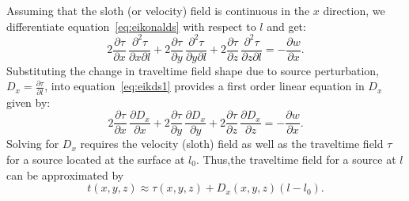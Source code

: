 Assuming that the sloth (or velocity) field is continuous in the $x$
direction, we differentiate equation~\ref{eq:eikonalds} with respect
to $l$ and get:
\begin{equation}
2 \frac{\partial \tau}{\partial x} \, \frac{\partial^2 \tau}{\partial x \partial l} + 
2 \frac{\partial \tau}{\partial y} \, \frac{\partial^2 \tau}{\partial y \partial l}+
2 \frac{\partial \tau}{\partial z} \, \frac{\partial^2 \tau}{\partial z \partial l} = -\frac{\partial w}{\partial x}.
\label{eq:eikds1}
\end{equation}
Substituting the change in traveltime field shape due to source
perturbation, $D_x=\frac{\partial \tau}{\partial l}$, into
equation~\ref{eq:eikds1} provides a first order linear equation in
$D_x$ given by:
\begin{equation}
2 \frac{\partial \tau}{\partial x} \, \frac{\partial D_x}{\partial x}+ 
2 \frac{\partial \tau}{\partial y} \, \frac{\partial D_x}{\partial y} +
2 \frac{\partial \tau}{\partial z} \, \frac{\partial D_x}{\partial z} = - \frac{\partial w}{\partial x}.
\label{eq:eikdsD}
\end{equation}
Solving for $D_x$ requires the velocity (sloth) field as well as the traveltime field $\tau$ for a source located at the surface at $l_0$. Thus,the 
traveltime field for a source at $l$ can be approximated by
\begin{equation}
t(x,y,z) \approx \tau(x,y,z) + D_x(x,y,z) (l-l_0).
\label{eq:eiktim}
\end{equation}


